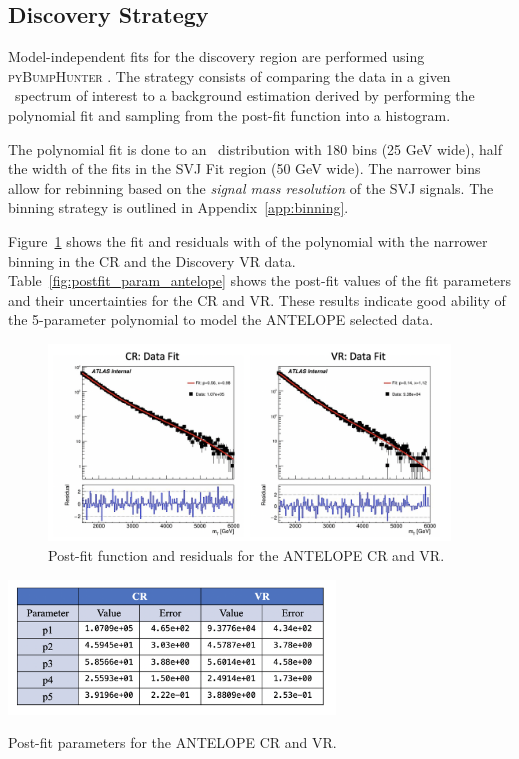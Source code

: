 \subsection{Discovery Strategy}
\label{subsec:fit_bh}

Model-independent fits for the discovery region are performed using \textsc{pyBumpHunter} \cite{bumphunt}.
The strategy consists of comparing the data in a given \mt~spectrum of interest to a background estimation derived by performing the polynomial fit and sampling from the post-fit function into a histogram.

The polynomial fit is done to an \mt~distribution with 180 bins (25 GeV wide), half the width of the fits in the SVJ Fit region (50 GeV wide). %
The narrower bins allow for rebinning based on the \textit{signal mass resolution} of the SVJ signals.
The binning strategy is outlined in Appendix~\ref{app:binning}.

Figure~\ref{fig:bkgfit_data_crvr_antelope} shows the fit and residuals with of the polynomial with the narrower binning in the CR and the Discovery VR data.
Table~\ref{fig:postfit_param_antelope} shows the post-fit values of the fit parameters and their uncertainties for the CR and VR. 
These results indicate good ability of the 5-parameter polynomial to model the ANTELOPE selected data.

\begin{figure}[!htbp]
\centering
   \includegraphics[width=0.95\textwidth]{figures/stats/bkgfit_data_crvr_antelope}
    \caption{Post-fit function and residuals for the ANTELOPE CR and VR.
    \label{fig:bkgfit_data_crvr_antelope}}
\end{figure}

\begin{table}[!htbp]
\centering
   \includegraphics[width=0.65\textwidth]{figures/stats/postfit_param_antelope}
    \caption{Post-fit parameters for the ANTELOPE CR and VR.
    \label{fig:postfit_param_antelope}}
\end{table}

